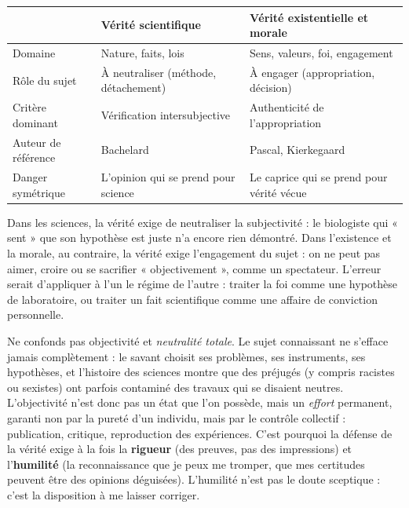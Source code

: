 \documentclass[11pt]{article}
\newcommand{\cle}[1]{{\popxbold\color{popdark}#1}}
\begin{document}
\begin{center}
\begin{tabularx}{\linewidth}{|l|X|X|}
\hline
\rowcolor{popblueL} & \textbf{Vérité scientifique} & \textbf{Vérité existentielle et morale} \\
\hline
Domaine & Nature, faits, lois & Sens, valeurs, foi, engagement \\
\hline
Rôle du sujet & À neutraliser (méthode, détachement) & À engager (appropriation, décision) \\
\hline
Critère dominant & Vérification intersubjective & Authenticité de l'appropriation \\
\hline
Auteur de référence & Bachelard & Pascal, Kierkegaard \\
\hline
Danger symétrique & L'opinion qui se prend pour science & Le caprice qui se prend pour vérité vécue \\
\hline
\end{tabularx}
\end{center}

Dans les sciences, la vérité exige de neutraliser la subjectivité : le biologiste qui « sent » que son hypothèse est juste n'a encore rien démontré. Dans l'existence et la morale, au contraire, la vérité exige l'engagement du sujet : on ne peut pas aimer, croire ou se sacrifier « objectivement », comme un spectateur. L'erreur serait d'appliquer à l'un le régime de l'autre : traiter la foi comme une hypothèse de laboratoire, ou traiter un fait scientifique comme une affaire de conviction personnelle.

\begin{attention}
Ne confonds pas \cle{objectivité} et \emph{neutralité totale}. Le sujet connaissant ne s'efface jamais complètement : le savant choisit ses problèmes, ses instruments, ses hypothèses, et l'histoire des sciences montre que des préjugés (y compris racistes ou sexistes) ont parfois contaminé des travaux qui se disaient neutres. L'objectivité n'est donc pas un état que l'on possède, mais un \emph{effort} permanent, garanti non par la pureté d'un individu, mais par le contrôle collectif : publication, critique, reproduction des expériences. C'est pourquoi la défense de la vérité exige à la fois la \textbf{rigueur} (des preuves, pas des impressions) et l'\textbf{humilité} (la reconnaissance que je peux me tromper, que mes certitudes peuvent être des opinions déguisées). L'humilité n'est pas le doute sceptique : c'est la disposition à me laisser corriger.
\end{attention}
\end{document}
